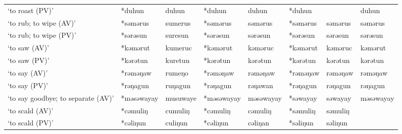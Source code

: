 \begin{landscape}
\begin{longtable}[c]{@{}p{3cm}<{\raggedright}p{2.75cm}<{\raggedright}p{2.75cm}<{\raggedright}p{2.75cm}<{\raggedright}p{2.75cm}<{\raggedright}p{2.75cm}<{\raggedright}p{2.75cm}<{\raggedright}p{2.75cm}<{\raggedright}@{}}
`to roast (PV)'                                      & *duhun             & duhun                          & *duhun             & duhun                      & *duhun           &                          & duhun                             \\
`to rub; to wipe (AV)'                               & *səmərus           & sumerus                        & *səmərus           & səmərus                    & *səmərus         & səmərus                  & səmərus                           \\
`to rub; to wipe (PV)'                               & *sərəsun           & suresun                        & *sərəsun           & sərəsun                    & *sərəsun         & sərəsun                  & sərəsun                           \\
`to saw (AV)'                                        & *kəmərut           & kumeruc                        & *kəmərut           & kəməruc                    & *kəmərut         & kəməruc                  & kəmərut                           \\
`to saw (PV)'                                        & *kərətun           & kuretun                        & *kərətun           & kərətun                    & *kərətun         & kərətun                  & kərətun                           \\
`to say (AV)'                                        & *rəməŋaw           & rumeŋo                         & *rəməŋaw           & rəməŋaw                    & *rəməŋaw         & rəməŋaw                  & rəməŋaw                           \\
`to say (PV)'                                        & *rəŋagun           & ruŋagun                        & *rəŋagun           & rəŋawan                    & *rəŋagun         & rəŋagun                  & rəŋagun                           \\
`to say goodbye; to separate (AV)'                   & *məsəwayay         & musuwaye                       & *məsəwayay         & məsəwayay                  & *səwayay         & səwayay                  & məsəwayay                         \\
`to scald (AV)'                                      & *cəmuliŋ           & cumuliŋ                        & *cəmuliŋ           & cəmuliŋ                    & *səmuliŋ         & səmuliŋ                  &                                   \\
`to scald (PV)'                                      & *cəliŋun           & culiŋun                        & *cəliŋun           & cəliŋan                    & *səliŋun         & səliŋun                  &                                   \\

\end{longtable}
\end{landscape}
